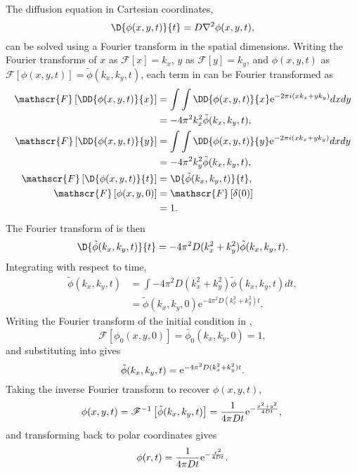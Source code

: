 The diffusion equation in Cartesian coordinates,
\begin{equation}
  \D{\phi(x,y,t)}{t} = D \nabla^2 \phi(x,y,t) ,
  \label{eqn:diffusion_cartesian}
\end{equation}
 can be solved using a Fourier transform in the spatial dimensions. Writing the Fourier transforms of $x$ as $\mathscr{F}\left[x \right] = k_x$, $y$ as $\mathscr{F}\left[y \right] = k_y$, and $\phi(x,y,t)$ as $\mathscr{F}\left[ \phi(x,y,t) \right] = \tilde{\phi}(k_x,k_y,t)$, each term in  can be Fourier transformed as
\begin{align}
  \mathscr{F}\left[ \DD{\phi(x,y,t)}{x} \right] &= \int \int \DD{\phi(x,y,t)}{x} \mathrm{e}^{-2\pi i(xk_x + yk_y)} dx dy \\
  &= -4\pi^2k_x^2 \tilde{\phi}(k_x,k_y,t), \\
  \mathscr{F}\left[ \DD{\phi(x,y,t)}{y} \right] &= \int \int \DD{\phi(x,y,t)}{y} \mathrm{e}^{-2\pi i(xk_x + yk_y)} dx dy \\
  &= -4\pi^2k_y^2 \tilde{\phi}(k_x,k_y,t), \\
  \mathscr{F}\left[\D{\phi(x,y,t)}{t}\right] &= \D{\tilde{\phi}(k_x,k_y,t)}{t},\\
  \mathscr{F}\left[\phi(x,y,0)\right] &= \mathscr{F}\left[\delta(0)\right]  \\
  &= 1 .
\end{align}
%
The Fourier transform of  is then
%
\begin{equation}
  \D{\tilde{\phi}(k_x,k_y,t)}{t} = -4\pi^2D (k_x^2 + k_y^2) \tilde{\phi}(k_x,k_y,t).
\end{equation}
%
Integrating with respect to time,
%
\begin{align}
  \tilde{\phi}(k_x,k_y,t) &= \int -4\pi^2D (k_x^2 + k_y^2) \tilde{\phi}(k_x,k_y,t) dt, \\
  &= \tilde{\phi}(k_x,k_y,0)\mathrm{e}^{-4\pi^2D(k_x^2 + k_y^2)t}.
  \label{eqn:fourier_diffusion}
\end{align}
%
Writing the Fourier transform of the initial condition in ,
%
\begin{equation}
\mathscr{F}\left[\phi_0(x,y,0)\right] = \tilde{\phi_0}(k_x,k_y,0) = 1,
\end{equation}
%
and substituting into  gives
%
\begin{equation}
  \tilde{\phi}(k_x,k_y,t) = \mathrm{e}^{-4\pi^2D(k_x^2 + k_y^2)t}. \\
\end{equation}
%
Taking the inverse Fourier transform to recover $\phi(x,y,t)$,
%
\begin{equation}
  \phi(x,y,t) = \mathscr{F}^{-1}\left[\tilde{\phi}(k_x,k_y,t)\right] = \frac{1}{4\pi Dt}\mathrm{e}^{-\frac{x^2 + y^2}{4Dt}}, \\
\end{equation}
%
and transforming back to polar coordinates gives
\begin{equation}
  \phi(r,t) = \frac{1}{4\pi Dt}\mathrm{e}^{-\frac{r^2}{4Dt}} .\\
  \label{eqn:diffusion_solution}
\end{equation}
